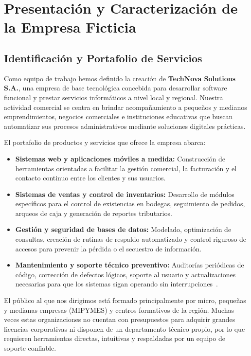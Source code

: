 \documentclass[12pt,a4paper,oneside]{article}
\begin{document}
\setcounter{page}{1}
\tableofcontents
\clearpage
{}

\section{Presentación y Caracterización de la Empresa Ficticia}

\subsection{Identificación y Portafolio de Servicios}
Como equipo de trabajo hemos definido la creación de \textbf{TechNova Solutions S.A.}, una empresa de base tecnológica concebida para desarrollar software funcional y prestar servicios informáticos a nivel local y regional. Nuestra actividad comercial se centra en brindar acompañamiento a pequeños y medianos emprendimientos, negocios comerciales e instituciones educativas que buscan automatizar sus procesos administrativos mediante soluciones digitales prácticas.

El portafolio de productos y servicios que ofrece la empresa abarca:
\begin{itemize}[leftmargin=1.8em,itemsep=2pt]
    \item \textbf{Sistemas web y aplicaciones móviles a medida:} Construcción de herramientas orientadas a facilitar la gestión comercial, la facturación y el contacto continuo entre los clientes y sus usuarios.
    \item \textbf{Sistemas de ventas y control de inventarios:} Desarrollo de módulos específicos para el control de existencias en bodegas, seguimiento de pedidos, arqueos de caja y generación de reportes tributarios.
    \item \textbf{Gestión y seguridad de bases de datos:} Modelado, optimización de consultas, creación de rutinas de respaldo automatizado y control riguroso de accesos para prevenir la pérdida o el secuestro de información.
    \item \textbf{Mantenimiento y soporte técnico preventivo:} Auditorías periódicas de código, corrección de defectos lógicos, soporte al usuario y actualizaciones necesarias para que los sistemas sigan operando sin interrupciones~\cite{sommerville2011}.
\end{itemize}

El público al que nos dirigimos está formado principalmente por micro, pequeñas y medianas empresas (MIPYMES) y centros formativos de la región. Muchas veces estas organizaciones no cuentan con presupuestos para adquirir grandes licencias corporativas ni disponen de un departamento técnico propio, por lo que requieren herramientas directas, intuitivas y respaldadas por un equipo de soporte confiable.
\end{document}
